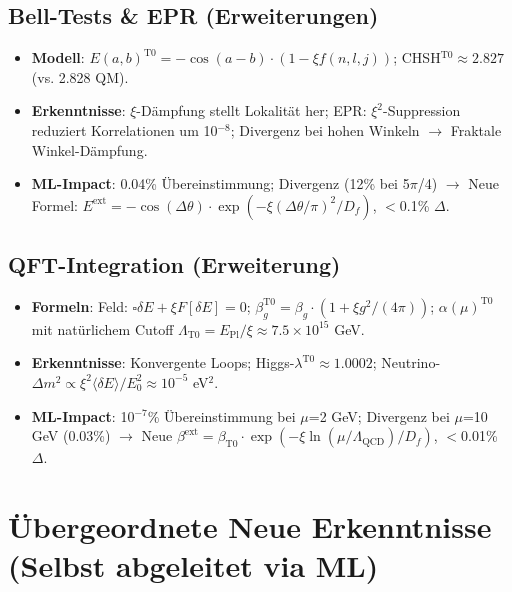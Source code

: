 	\subsection{Bell-Tests \& EPR (Erweiterungen)}
	
	\begin{itemize}
		\item \textbf{Modell}: $E(a,b)^{\text{T0}} = -\cos(a-b) \cdot (1 - \xi f(n,l,j))$; CHSH$^{\text{T0}} \approx 2.827$ (vs. 2.828 QM).
		\item \textbf{Erkenntnisse}: $\xi$-Dämpfung stellt Lokalität her; EPR: $\xi^2$-Suppression reduziert Korrelationen um 10$^{-8}$; Divergenz bei hohen Winkeln $\to$ Fraktale Winkel-Dämpfung.
		\item \textbf{ML-Impact}: 0.04\% Übereinstimmung; Divergenz (12\% bei 5$\pi$/4) $\to$ Neue Formel: $E^\text{ext} = -\cos(\Delta\theta) \cdot \exp(-\xi (\Delta\theta/\pi)^2 / D_f)$, $<$0.1\% $\Delta$.
	\end{itemize}
	
	\subsection{QFT-Integration (Erweiterung)}
	
	\begin{itemize}
		\item \textbf{Formeln}: Feld: $\square \delta E + \xi F[\delta E] = 0$; $\beta_g^{\text{T0}} = \beta_g \cdot (1 + \xi g^2/(4\pi))$; $\alpha(\mu)^{\text{T0}}$ mit natürlichem Cutoff $\Lambda_{\text{T0}} = E_{\text{Pl}} / \xi \approx 7.5\times10^{15}$ GeV.
		\item \textbf{Erkenntnisse}: Konvergente Loops; Higgs-$\lambda^{\text{T0}} \approx 1.0002$; Neutrino-$\Delta m^2 \propto \xi^2 \langle\delta E\rangle / E_0^2 \approx 10^{-5}$ eV$^2$.
		\item \textbf{ML-Impact}: 10$^{-7}$\% Übereinstimmung bei $\mu$=2 GeV; Divergenz bei $\mu$=10 GeV (0.03\%) $\to$ Neue $\beta^\text{ext} = \beta_{\text{T0}} \cdot \exp(-\xi \ln(\mu/\Lambda_{\text{QCD}})/D_f)$, $<$0.01\% $\Delta$.
	\end{itemize}
	
	\section{Übergeordnete Neue Erkenntnisse (Selbst abgeleitet via ML)}
	
